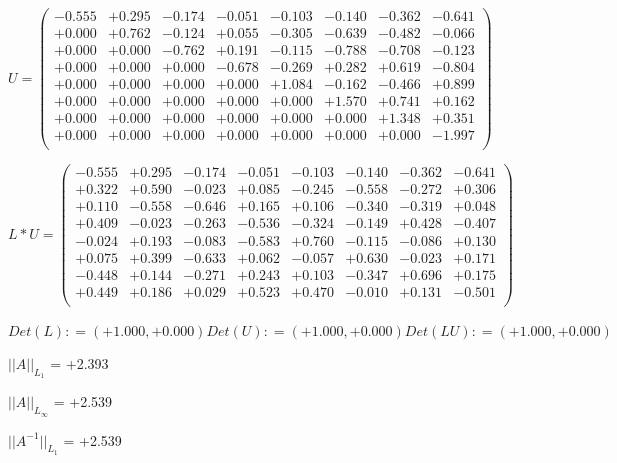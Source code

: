 \documentclass[9pt]{article}
\theoremstyle{plain}
\theoremstyle{definition}
\theoremstyle{remark}
\numberwithin{equation}{section}
\begin{document}
$U = \left(
\begin{array}{
cccccccc}
-0.555 & +0.295 & -0.174 & -0.051 & -0.103 & -0.140 & -0.362 & -0.641 \\
+0.000 & +0.762 & -0.124 & +0.055 & -0.305 & -0.639 & -0.482 & -0.066 \\
+0.000 & +0.000 & -0.762 & +0.191 & -0.115 & -0.788 & -0.708 & -0.123 \\
+0.000 & +0.000 & +0.000 & -0.678 & -0.269 & +0.282 & +0.619 & -0.804 \\
+0.000 & +0.000 & +0.000 & +0.000 & +1.084 & -0.162 & -0.466 & +0.899 \\
+0.000 & +0.000 & +0.000 & +0.000 & +0.000 & +1.570 & +0.741 & +0.162 \\
+0.000 & +0.000 & +0.000 & +0.000 & +0.000 & +0.000 & +1.348 & +0.351 \\
+0.000 & +0.000 & +0.000 & +0.000 & +0.000 & +0.000 & +0.000 & -1.997 \\
\end{array}
\right)$ \newline 

$L * U  = \left(
\begin{array}{
cccccccc}
-0.555 & +0.295 & -0.174 & -0.051 & -0.103 & -0.140 & -0.362 & -0.641 \\
+0.322 & +0.590 & -0.023 & +0.085 & -0.245 & -0.558 & -0.272 & +0.306 \\
+0.110 & -0.558 & -0.646 & +0.165 & +0.106 & -0.340 & -0.319 & +0.048 \\
+0.409 & -0.023 & -0.263 & -0.536 & -0.324 & -0.149 & +0.428 & -0.407 \\
-0.024 & +0.193 & -0.083 & -0.583 & +0.760 & -0.115 & -0.086 & +0.130 \\
+0.075 & +0.399 & -0.633 & +0.062 & -0.057 & +0.630 & -0.023 & +0.171 \\
-0.448 & +0.144 & -0.271 & +0.243 & +0.103 & -0.347 & +0.696 & +0.175 \\
+0.449 & +0.186 & +0.029 & +0.523 & +0.470 & -0.010 & +0.131 & -0.501 \\
\end{array}
\right)$ \newline 

$Det(L) :    = (+1.000,+0.000)     Det(U) :    = (+1.000,+0.000)     Det(LU) :    = (+1.000,+0.000)$

$||A||_{L_1}$  = +2.393

$||A||_{L_{\infty}}$ = +2.539

$||A^{-1}||_{L_1}$  = +2.539
\end{document}
